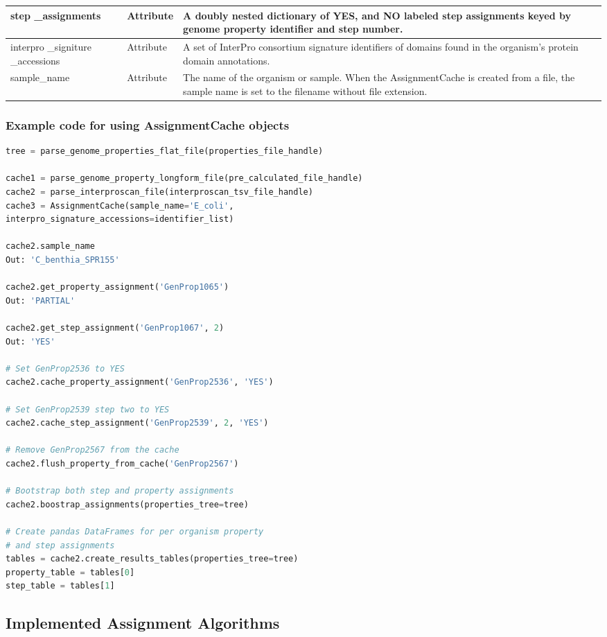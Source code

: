 \begin{longtable}{|p{2.7cm}|p{2cm}|p{10cm}|}
step \_assignments & Attribute & A doubly nested dictionary of YES, and NO labeled step assignments keyed by genome property identifier and step number. \\ \hline
interpro \_signiture \_accessions & Attribute & A set of InterPro consortium signature identifiers of domains found in the organism's protein domain annotations. \\ \hline
sample\_name & Attribute & The name of the organism or sample. When the AssignmentCache is created from a file, the sample name is set to the filename without file extension. \\ \hline
\end{longtable}

\subsubsection{Example code for using AssignmentCache  objects}

\begin{lstlisting}[language=Python]
tree = parse_genome_properties_flat_file(properties_file_handle)

cache1 = parse_genome_property_longform_file(pre_calculated_file_handle)
cache2 = parse_interproscan_file(interproscan_tsv_file_handle)
cache3 = AssignmentCache(sample_name='E_coli', 
interpro_signature_accessions=identifier_list)

cache2.sample_name
Out: 'C_benthia_SPR155'

cache2.get_property_assignment('GenProp1065')
Out: 'PARTIAL'

cache2.get_step_assignment('GenProp1067', 2) 
Out: 'YES'

# Set GenProp2536 to YES
cache2.cache_property_assignment('GenProp2536', 'YES')

# Set GenProp2539 step two to YES
cache2.cache_step_assignment('GenProp2539', 2, 'YES')

# Remove GenProp2567 from the cache
cache2.flush_property_from_cache('GenProp2567')

# Bootstrap both step and property assignments
cache2.boostrap_assignments(properties_tree=tree)

# Create pandas DataFrames for per organism property
# and step assignments
tables = cache2.create_results_tables(properties_tree=tree)
property_table = tables[0]
step_table = tables[1]

\end{lstlisting}

\subsection{Implemented Assignment Algorithms}

